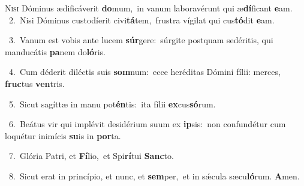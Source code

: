 \lettrine{\initial\textcolor{\initialcolor}{N}}{isi} Dóminus ædificáverit \textbf{do}\-mum,~\star in vanum laboravérunt qui æ\-\textbf{dí}\-ficant \textbf{e}\-am.\\
{\numbfont\textcolor{\numbcolor}{~2.}}~Nisi Dóminus custodíerit civi\-\textbf{tá}\-tem,~\star frustra vígilat qui cus\-\textbf{tó}\-dit \textbf{e}\-am.\par
{\numbfont\textcolor{\numbcolor}{~3.}}~Vanum est vobis ante lucem \textbf{súr}\-gere:~\star súrgite postquam sedéritis, qui manducátis \textbf{pa}\-nem do\-\textbf{ló}\-ris.\par
{\numbfont\textcolor{\numbcolor}{~4.}}~Cum déderit diléctis suis \textbf{som}\-num:~\star ecce heréditas Dómini fílii: merces, \textbf{fruc}\-tus \textbf{ven}\-tris.\par
{\numbfont\textcolor{\numbcolor}{~5.}}~Sicut sagíttæ in manu pot\-\textbf{én}\-tis:~\star ita fílii \textbf{ex}\-cus\-\textbf{só}\-rum.\par
{\numbfont\textcolor{\numbcolor}{~6.}}~Beátus vir qui implévit desidérium suum ex \textbf{ip}\-sis:~\star non confundétur cum loquétur inimícis \textbf{su}\-is in \textbf{por}\-ta.\par
{\numbfont\textcolor{\numbcolor}{~7.}}~Glória Patri, et \textbf{Fí}\-lio,~\star et Spi\-\textbf{rí}\-tui \textbf{Sanc}\-to.\par
{\numbfont\textcolor{\numbcolor}{~8.}}~Sicut erat in princípio, et nunc, et \textbf{sem}\-per,~\star et in sǽcula sæcu\-\textbf{ló}\-rum. \textbf{A}\-men.\par
